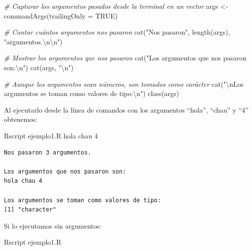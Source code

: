 \documentclass[
]{book}
\newenvironment{Shaded}{\begin{snugshade}}{\end{snugshade}}
\newcommand{\AttributeTok}[1]{\textcolor[rgb]{0.77,0.63,0.00}{#1}}
\newcommand{\CommentTok}[1]{\textcolor[rgb]{0.56,0.35,0.01}{\textit{#1}}}
\newcommand{\ConstantTok}[1]{\textcolor[rgb]{0.00,0.00,0.00}{#1}}
\newcommand{\ExtensionTok}[1]{#1}
\newcommand{\FunctionTok}[1]{\textcolor[rgb]{0.00,0.00,0.00}{#1}}
\newcommand{\NormalTok}[1]{#1}
\newcommand{\OtherTok}[1]{\textcolor[rgb]{0.56,0.35,0.01}{#1}}
\newcommand{\SpecialCharTok}[1]{\textcolor[rgb]{0.00,0.00,0.00}{#1}}
\newcommand{\StringTok}[1]{\textcolor[rgb]{0.31,0.60,0.02}{#1}}
\begin{document}
\begin{Shaded}
\begin{Highlighting}[]
\CommentTok{\# Capturar los argumentos pasados desde la terminal en un vector}
\NormalTok{args }\OtherTok{\textless{}{-}} \FunctionTok{commandArgs}\NormalTok{(}\AttributeTok{trailingOnly =} \ConstantTok{TRUE}\NormalTok{)}

\CommentTok{\# Contar cuántos argumentos nos pasaron}
\FunctionTok{cat}\NormalTok{(}\StringTok{"Nos pasaron"}\NormalTok{, }\FunctionTok{length}\NormalTok{(args), }\StringTok{"argumentos.}\SpecialCharTok{\textbackslash{}n\textbackslash{}n}\StringTok{"}\NormalTok{)}

\CommentTok{\# Mostrar los argumentos que nos pasaron}
\FunctionTok{cat}\NormalTok{(}\StringTok{"Los argumentos que nos pasaron son:}\SpecialCharTok{\textbackslash{}n}\StringTok{"}\NormalTok{)}
\FunctionTok{cat}\NormalTok{(args, }\StringTok{"}\SpecialCharTok{\textbackslash{}n}\StringTok{"}\NormalTok{)}

\CommentTok{\# Aunque los argumentos sean números, son tomados como carácter}
\FunctionTok{cat}\NormalTok{(}\StringTok{"}\SpecialCharTok{\textbackslash{}n}\StringTok{Los argumentos se toman como valores de tipo:}\SpecialCharTok{\textbackslash{}n}\StringTok{"}\NormalTok{)}
\FunctionTok{class}\NormalTok{(args)}
\end{Highlighting}
\end{Shaded}

Al ejecutarlo desde la línea de comandos con los argumentos ``hola'', ``chau'' y ``4'' obtenemos:

\begin{Shaded}
\begin{Highlighting}[]
\ExtensionTok{Rscript}\NormalTok{ ejemplo1.R hola chau 4}
\end{Highlighting}
\end{Shaded}

\begin{verbatim}
Nos pasaron 3 argumentos.

Los argumentos que nos pasaron son:
hola chau 4 

Los argumentos se toman como valores de tipo:
[1] "character"
\end{verbatim}

Si lo ejecutamos sin argumentos:

\begin{Shaded}
\begin{Highlighting}[]
\ExtensionTok{Rscript}\NormalTok{ ejemplo1.R}
\end{Highlighting}
\end{Shaded}
\end{document}
